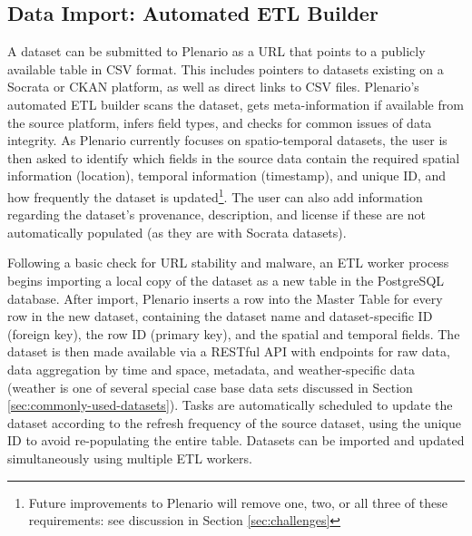 \documentclass[11pt]{article}
\begin{document}
\subsection[data-import]{Data Import: \textbf{Automated ETL Builder}}
A dataset can be submitted to Plenario as a URL that points to a publicly available table in CSV format. This includes pointers to datasets existing on a Socrata or CKAN platform, as well as direct links to CSV files. Plenario's automated ETL builder scans the dataset, gets meta-information if available from the source platform, infers field types, and checks for common issues of data integrity. As Plenario currently focuses on spatio-temporal datasets, the user is then asked to identify which fields in the source data contain the required spatial information (location), temporal information (timestamp), and unique ID, and how frequently the dataset is updated\footnote{Future improvements to Plenario will remove one, two, or all three of these requirements: see discussion in Section \ref{sec:challenges}}. The user can also add information regarding the dataset's provenance, description, and license if these are not automatically populated (as they are with Socrata datasets). 

Following a basic check for URL stability and malware, an ETL worker process begins importing a local copy of the dataset as a new table in the PostgreSQL database. After import, Plenario inserts a row into the Master Table for every row in the new dataset, containing the dataset name and dataset-specific ID (foreign key), the row ID (primary key), and the spatial and temporal fields. The dataset is then made available via a RESTful API with endpoints for raw data, data aggregation by time and space, metadata, and weather-specific data (weather is one of several special case base data sets discussed in Section \ref{sec:commonly-used-datasets}). Tasks are automatically scheduled to update the dataset according to the refresh frequency of the source dataset, using the unique ID to avoid re-populating the entire table. Datasets can be imported and updated simultaneously using multiple ETL workers.
\end{document}

